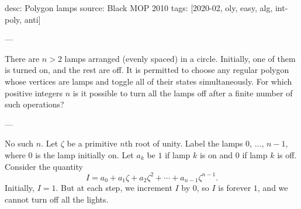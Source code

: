 desc: Polygon lamps
source: Black MOP 2010
tags: [2020-02, oly, easy, alg, int-poly, anti]

---

There are $n>2$ lamps arranged (evenly spaced) in a circle. Initially, one of them is turned on, and the rest are off. It is permitted to choose any regular polygon whose vertices are lamps and toggle all of their states simultaneously. For which positive integers $n$ is it possible to turn all the lamps off after a finite number of such operations?

---

No such $n$. Let $\zeta$ be a primitive $n$th root of unity. Label the lamps $0$, $\ldots$, $n-1$, where $0$ is the lamp initially on. Let $a_k$ be $1$ if lamp $k$ is on and $0$ if lamp $k$ is off. Consider the quantity \[I=a_0+a_1\zeta+a_2\zeta^2+\cdots+a_{n-1}\zeta^{n-1}.\]
Initially, $I=1$. But at each step, we increment $I$ by $0$, so $I$ is forever $1$, and we cannot turn off all the lights.

